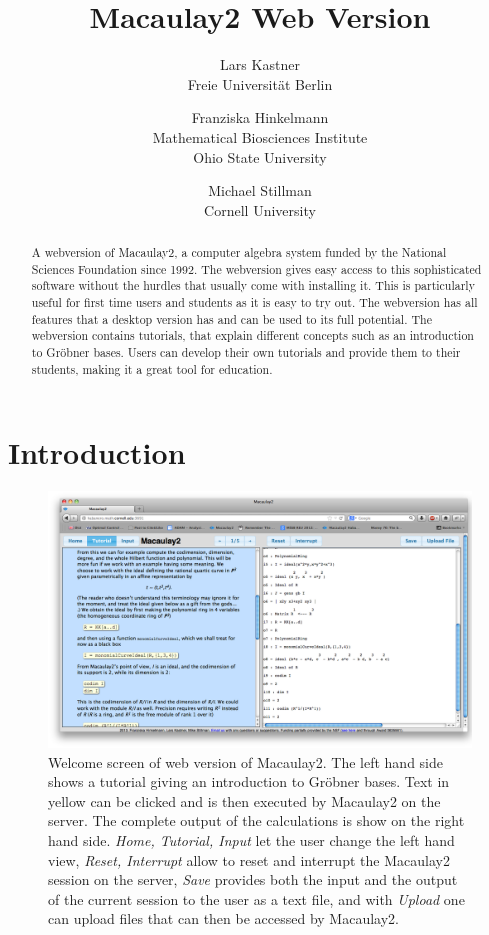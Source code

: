 \documentclass[]{article}
\title{Macaulay2 Web Version}
\author{Lars Kastner\\ Freie Universit\"at Berlin \and 
Franziska Hinkelmann\\Mathematical Biosciences Institute\\ Ohio State University \and 
Michael Stillman\\Cornell University  }
\date{}
\begin{document}
\ifpdf
{}
\else
{}
\fi

\maketitle


\begin{abstract}

    A webversion of Macaulay2, a computer algebra system funded by the
    National Sciences Foundation since 1992. The webversion gives easy
    access to this sophisticated software without the hurdles that
    usually come with installing it. This is particularly useful for
    first time users and students as it is easy to try out. The
    webversion has all features that a desktop version has and can be
    used to its full potential. The webversion contains tutorials,
    that explain different concepts such as an introduction to
    Gr\"obner bases. Users can develop their own tutorials and provide
    them to their students, making it a great tool for education.

\end{abstract}

\section{Introduction}
\begin{figure}[htb]
    \includegraphics[width=.95\textwidth]{homeWebsite.jpg}
    \caption{Welcome screen of web version of Macaulay2. The left hand
      side shows a tutorial giving an introduction to Gr\"obner
      bases. Text in yellow can be clicked and is then executed by
      Macaulay2 on the server. The complete output of the calculations
      is show on the right hand side. {\it Home, Tutorial, Input} let
      the user change the left hand view, {\it Reset, Interrupt} allow
      to reset and interrupt the Macaulay2 session on the server, {\it
        Save} provides both the input and the output of the current
      session to the user as a text file, and with {\it Upload} one
      can upload files that can then be accessed by Macaulay2.}
    \label{fig:home}
\end{figure}
\end{document}
